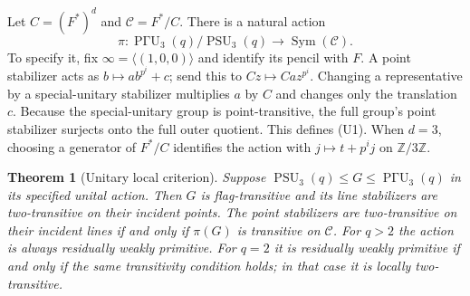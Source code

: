 \documentclass[11pt,a4paper]{article}
\newtheorem{theorem}{Theorem}[section]
\newcommand{\PSU}{\operatorname{PSU}}
\newcommand{\PGammaU}{\operatorname{P\Gamma U}}
\begin{document}
Let $C=(F^*)^d$ and $\mathcal C=F^*/C$. There is a natural action
\[
 \pi:\PGammaU_3(q)/\PSU_3(q)\longrightarrow\operatorname{Sym}(\mathcal C).
 \tag{U1}
\]
To specify it, fix $\infty=\langle(1,0,0)\rangle$ and identify its pencil
with $F$. A point stabilizer acts as $b\mapsto ab^{p^i}+c$; send this to
$Cz\mapsto Ca z^{p^i}$. Changing a representative by a special-unitary
stabilizer multiplies $a$ by $C$ and changes only the translation $c$.
Because the special-unitary group is point-transitive, the full group's point stabilizer
surjects onto the full outer quotient. This defines (U1). When $d=3$,
choosing a generator of $F^*/C$ identifies the action with
$j\mapsto t+p^i j$ on $\mathbb Z/3\mathbb Z$.

\begin{theorem}[Unitary local criterion]\label{unitary}
Suppose $\PSU_3(q)\leq G\leq\PGammaU_3(q)$ in its specified unital action.
Then $G$ is flag-transitive and its line stabilizers are two-transitive on
their incident points. The point stabilizers are two-transitive on their
incident lines if and only if $\pi(G)$ is transitive on $\mathcal C$.
For $q>2$ the action is always residually weakly primitive. For $q=2$
it is residually weakly primitive if and only if the same transitivity
condition holds; in that case it is locally two-transitive.
\end{theorem}
\end{document}
